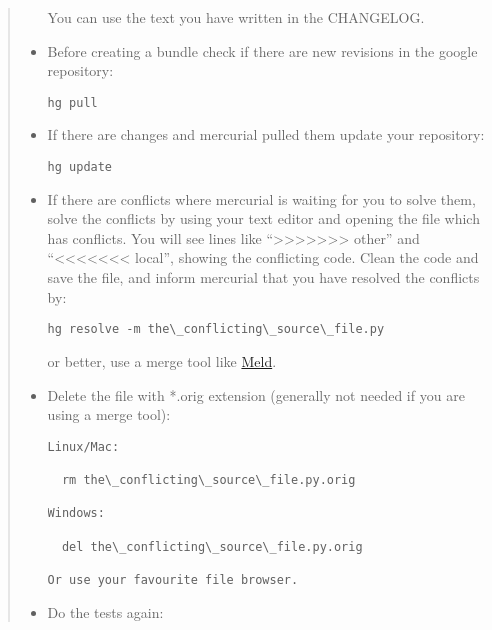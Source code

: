 \documentclass[a4paper,10pt,english]{sphinxmanual}
\begin{document}
\begin{quote}
\begin{itemize}
You can use the text you have written in the CHANGELOG.

\item {} 
Before creating a bundle check if there are new revisions in the
google repository:

\begin{Verbatim}[commandchars=\\\{\}]
hg pull
\end{Verbatim}

\item {} 
If there are changes and mercurial pulled them update your repository:

\begin{Verbatim}[commandchars=\\\{\}]
hg update
\end{Verbatim}

\item {} 
If there are conflicts where mercurial is waiting for you to solve them,
solve the conflicts by using your text editor and opening the file which has
conflicts. You will see lines like ``\textgreater{}\textgreater{}\textgreater{}\textgreater{}\textgreater{}\textgreater{}\textgreater{} other'' and ``\textless{}\textless{}\textless{}\textless{}\textless{}\textless{}\textless{} local'',
showing the conflicting code. Clean the code and save the file, and inform
mercurial that you have resolved the conflicts by:

\begin{Verbatim}[commandchars=\\\{\}]
hg resolve -m the\_conflicting\_source\_file.py
\end{Verbatim}

or better, use a merge tool like \href{http://meld.sourceforge.net/}{Meld}.

\item {} 
Delete the file with *.orig extension (generally not needed if you are
using a merge tool):

\begin{Verbatim}[commandchars=\\\{\}]
Linux/Mac:

  rm the\_conflicting\_source\_file.py.orig

Windows:

  del the\_conflicting\_source\_file.py.orig

Or use your favourite file browser.
\end{Verbatim}

\item {} 
Do the tests again:
\begin{quote}


\end{quote}
\end{itemize}
\end{quote}
\end{document}
